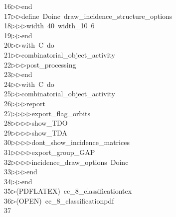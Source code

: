 \begin{tabbing}
16\>$\triangleright$\>$\triangleright$\>end\ \\[0pt]
17\>$\triangleright$\>$\triangleright$\>define\ Doinc\ draw\_incidence\_structure\_options\ \\[0pt]
18\>$\triangleright$\>$\triangleright$\>$\triangleright$\>width\ 40\ width\_10\ 6\ \\[0pt]
19\>$\triangleright$\>$\triangleright$\>end\ \\[0pt]
20\>$\triangleright$\>$\triangleright$\>with\ C\ do\ \\[0pt]
21\>$\triangleright$\>$\triangleright$\>combinatorial\_object\_activity\ \\[0pt]
22\>$\triangleright$\>$\triangleright$\>$\triangleright$\>post\_processing\ \\[0pt]
23\>$\triangleright$\>$\triangleright$\>end\ \\[0pt]
24\>$\triangleright$\>$\triangleright$\>with\ C\ do\ \\[0pt]
25\>$\triangleright$\>$\triangleright$\>combinatorial\_object\_activity\ \\[0pt]
26\>$\triangleright$\>$\triangleright$\>$\triangleright$\>report\ \\[0pt]
27\>$\triangleright$\>$\triangleright$\>$\triangleright$\>$\triangleright$\>export\_flag\_orbits\ \\[0pt]
28\>$\triangleright$\>$\triangleright$\>$\triangleright$\>$\triangleright$\>show\_TDO\ \\[0pt]
29\>$\triangleright$\>$\triangleright$\>$\triangleright$\>$\triangleright$\>show\_TDA\ \\[0pt]
30\>$\triangleright$\>$\triangleright$\>$\triangleright$\>$\triangleright$\>dont\_show\_incidence\_matrices\ \\[0pt]
31\>$\triangleright$\>$\triangleright$\>$\triangleright$\>$\triangleright$\>export\_group\_GAP\ \\[0pt]
32\>$\triangleright$\>$\triangleright$\>$\triangleright$\>$\triangleright$\>incidence\_draw\_options\ Doinc\ \\[0pt]
33\>$\triangleright$\>$\triangleright$\>$\triangleright$\>end\ \\[0pt]
34\>$\triangleright$\>$\triangleright$\>end\\[0pt]
35\>$\triangleright$\>(PDFLATEX)\ cc\_8\_classificationtex\\[0pt]
36\>$\triangleright$\>(OPEN)\ cc\_8\_classificationpdf\\[0pt]
37\>\end{tabbing}
